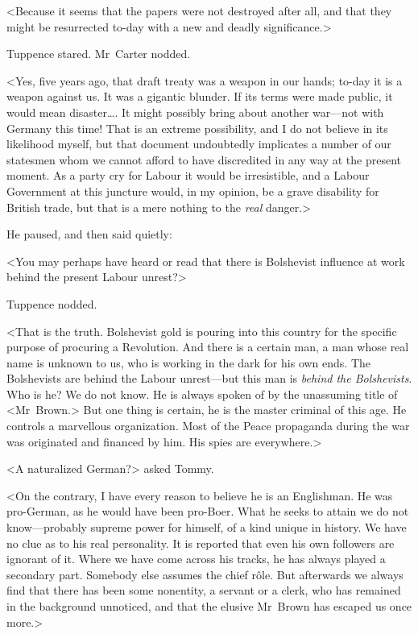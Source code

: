 <Because it seems that the papers were not destroyed after all, and that they might be resurrected to-day with a new and deadly significance.>

Tuppence stared. Mr~Carter nodded.

<Yes, five years ago, that draft treaty was a weapon in our hands; to-day it is a weapon against us. It was a gigantic blunder. If its terms were made public, it would mean disaster\dots. It might possibly bring about another war—not with Germany this time! That is an extreme possibility, and I do not believe in its likelihood myself, but that document undoubtedly implicates a number of our statesmen whom we cannot afford to have discredited in any way at the present moment. As a party cry for Labour it would be irresistible, and a Labour Government at this juncture would, in my opinion, be a grave disability for British trade, but that is a mere nothing to the \emph{real} danger.>

He paused, and then said quietly:

<You may perhaps have heard or read that there is Bolshevist influence at work behind the present Labour unrest?>

Tuppence nodded.

<That is the truth. Bolshevist gold is pouring into this country for the specific purpose of procuring a Revolution. And there is a certain man, a man whose real name is unknown to us, who is working in the dark for his own ends. The Bolshevists are behind the Labour unrest—but this man is \emph{behind the Bolshevists}. Who is he? We do not know. He is always spoken of by the unassuming title of <Mr~Brown.> But one thing is certain, he is the master criminal of this age. He controls a marvellous organization. Most of the Peace propaganda during the war was originated and financed by him. His spies are everywhere.>

<A naturalized German?> asked Tommy.

<On the contrary, I have every reason to believe he is an Englishman. He was pro-German, as he would have been pro-Boer. What he seeks to attain we do not know—probably supreme power for himself, of a kind unique in history. We have no clue as to his real personality. It is reported that even his own followers are ignorant of it. Where we have come across his tracks, he has always played a secondary part. Somebody else assumes the chief rôle. But afterwards we always find that there has been some nonentity, a servant or a clerk, who has remained in the background unnoticed, and that the elusive Mr~Brown has escaped us once more.>

